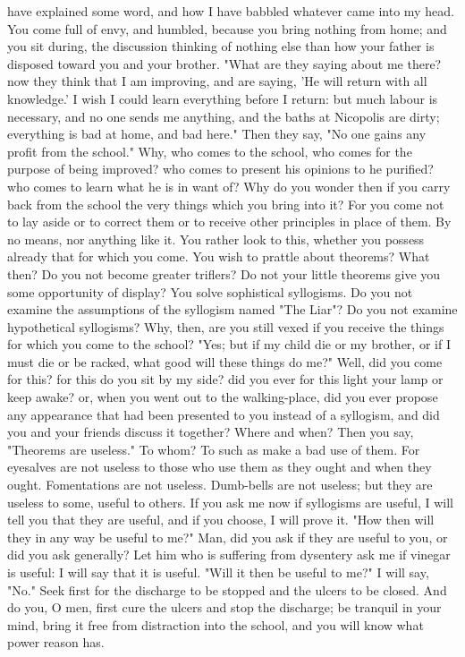 \documentclass[a4paper]{article}
\begin{document}
have explained some word, and how I have babbled whatever came into my head.
You come full of envy, and humbled, because you bring nothing from home; and
you sit during, the discussion thinking of nothing else than how your father is
disposed toward you and your brother. "What are they saying about me there? now
they think that I am improving, and are saying, 'He will return with all
knowledge.' I wish I could learn everything before I return: but much labour is
necessary, and no one sends me anything, and the baths at Nicopolis are dirty;
everything is bad at home, and bad here."
    Then they say, "No one gains any profit from the school." Why, who comes to
the school, who comes for the purpose of being improved? who comes to present
his opinions to he purified? who comes to learn what he is in want of? Why do
you wonder then if you carry back from the school the very things which you
bring into it? For you come not to lay aside or to correct them or to receive
other principles in place of them. By no means, nor anything like it. You
rather look to this, whether you possess already that for which you come. You
wish to prattle about theorems? What then? Do you not become greater triflers?
Do not your little theorems give you some opportunity of display? You solve
sophistical syllogisms. Do you not examine the assumptions of the syllogism
named "The Liar"? Do you not examine hypothetical syllogisms? Why, then, are
you still vexed if you receive the things for which you come to the school?
"Yes; but if my child die or my brother, or if I must die or be racked, what
good will these things do me?" Well, did you come for this? for this do you sit
by my side? did you ever for this light your lamp or keep awake? or, when you
went out to the walking-place, did you ever propose any appearance that had
been presented to you instead of a syllogism, and did you and your friends
discuss it together? Where and when? Then you say, "Theorems are useless." To
whom? To such as make a bad use of them. For eyesalves are not useless to those
who use them as they ought and when they ought. Fomentations are not useless.
Dumb-bells are not useless; but they are useless to some, useful to others. If
you ask me now if syllogisms are useful, I will tell you that they are useful,
and if you choose, I will prove it. "How then will they in any way be useful to
me?" Man, did you ask if they are useful to you, or did you ask generally? Let
him who is suffering from dysentery ask me if vinegar is useful: I will say
that it is useful. "Will it then be useful to me?" I will say, "No." Seek first
for the discharge to be stopped and the ulcers to be closed. And do you, O men,
first cure the ulcers and stop the discharge; be tranquil in your mind, bring
it free from distraction into the school, and you will know what power reason
has.
\end{document}
